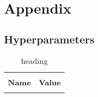 \chapter{Appendix}

\section{Hyperparameters}

\begin{table*}[h]
    \label{tab:VAE-Hyperparameters}
    \begin{center}
        \begin{tabular}{ l | l }
        \hline \\
        \textbf{Name} & \textbf{Value} \\
        \hline \\
        
        \end{tabular}
    \end{center}
    \caption*{heading}
\end{table*}